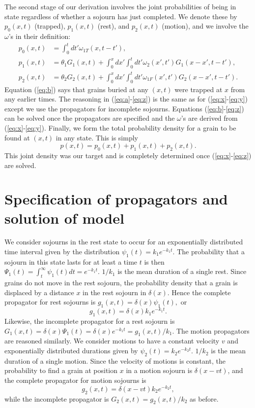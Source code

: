 \documentclass[draft,grl]{agujournal2018}
\newcommand\be{\begin{equation}}
\newcommand\ee{\end{equation}}
\begin{document}
The second stage of our derivation involves the joint probabilities of being in state regardless of whether a sojourn has just completed. We denote these by  $p_0(x,t)$ (trapped), $p_1(x,t)$ (rest), and $p_2(x,t)$ (motion), and we involve the $\omega$'s in their definition:
\begin{align}
p_0(x,t) &= \int_0^t dt' \omega_{1T}(x,t-t'), \label{eq:b}\\
p_1(x,t) &= \theta_1 G_1(x,t) + \int_0^x dx' \int_0^t dt' \omega_2(x',t')G_1(x-x',t-t'),\label{eq:a}\\
p_2(x,t) &= \theta_2 G_2(x,t) + \int_0^x dx' \int_0^t dt'  \omega_{1F}(x',t')G_2(x-x',t-t').\label{eq:z}
\end{align}
Equation (\ref{eq:b}) says that grains buried at any $(x,t)$ were trapped at $x$ from any earlier times.
The reasoning in (\ref{eq:a}-\ref{eq:z}) is the same as for (\ref{eq:x}-\ref{eq:y}) except we use the propagators for incomplete sojourns.
Equations (\ref{eq:b}-\ref{eq:z}) can be solved once the propagators are specified and the $\omega$'s are derived from (\ref{eq:x}-\ref{eq:y}).
Finally, we form the total probability density for a grain to be found at $(x,t)$ in any state.
This is simply 
\be p(x,t) = p_0(x,t) + p_1(x,t) + p_2(x,t). \label{eq:dist}\ee
This joint density was our target and is completely determined once (\ref{eq:x}-\ref{eq:z}) are solved.


\section{Specification of propagators and solution of model}
\label{sec:solution}
We consider sojourns in the rest state to occur for an exponentially distributed time interval given by the distribution $\psi_1(t) = k_1 e^{-k_1t}.$
The probability that a sojourn in this state lasts for at least a time $t$ is then $\Psi_1(t) = \int_t^\infty \psi_1(t)dt = e^{-k_1 t}$.
$1/k_1$ is the mean duration of a single rest.
Since grains do not move in the rest sojourn, the probability density that a grain is displaced by a distance $x$ in the rest sojourn in $\delta(x)$.
Hence the complete propagator for rest sojourns is $g_1(x,t) = \delta(x)\psi_1(t),$ or 
\be g_1(x,t) = \delta(x)k_1e^{-k_1t}.\label{eq:prop1} \ee
Likewise, the incomplete propagator for a rest sojourn is $G_1(x,t) = \delta(x)\Psi_1(t) = \delta(x)e^{-k_1t} = g_1(x,t)/k_1.$
The motion propagators are reasoned similarly.
We consider motions to have a constant velocity $v$ and exponentially distributed durations given by $\psi_2(t) = k_2 e^{-k_2t}.$
$1/k_2$ is the mean duration of a single motion.
Since the velocity of motions is constant, the probability to find a grain at position $x$ in a motion sojourn is $\delta(x-vt)$, and the complete propagator for motion sojourns is 
\be g_2(x,t) = \delta(x-vt)k_2e^{-k_2t},\label{eq:prop2}\ee
while the incomplete propagator is $G_2(x,t) = g_2(x,t)/k_2$ as before.
\end{document}
